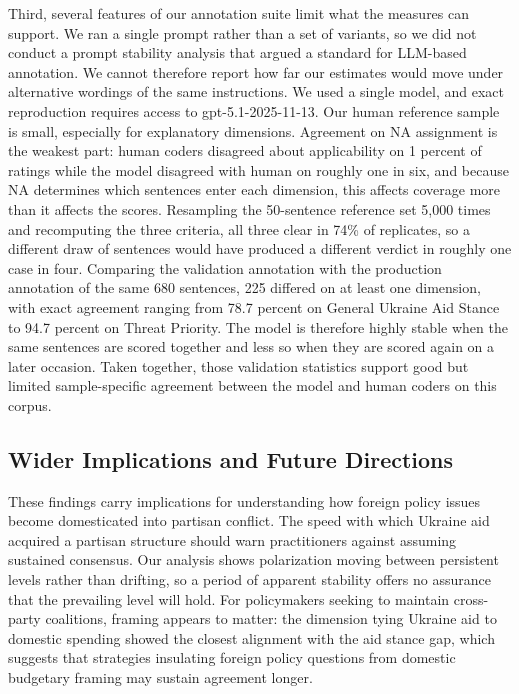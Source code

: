 Third, several features of our annotation suite limit what the measures can support. We ran a single prompt rather than a set of variants, so we did not conduct a prompt stability analysis that \citet{tornbergBestPracticesText2024} argued a standard for LLM-based annotation. We cannot therefore report how far our estimates would move under alternative wordings of the same instructions. We used a single model, and exact reproduction requires access to gpt-5.1-2025-11-13. Our human reference sample is small, especially for explanatory dimensions. Agreement on NA assignment is the weakest part: human coders disagreed about applicability on 1 percent of ratings while the model disagreed with human on roughly one in six, and because NA determines which sentences enter each dimension, this affects coverage more than it affects the scores. Resampling the 50-sentence reference set 5,000 times and recomputing the three criteria, all three clear in 74\% of replicates, so a different draw of sentences would have produced a different verdict in roughly one case in four. Comparing the validation annotation with the production annotation of the same 680 sentences, 225 differed on at least one dimension, with exact agreement ranging from 78.7 percent on General Ukraine Aid Stance to 94.7 percent on Threat Priority. The model is therefore highly stable when the same sentences are scored together and less so when they are scored again on a later occasion. Taken together, those validation statistics support good but limited sample-specific agreement between the model and human coders on this corpus.

\subsection{Wider Implications and Future Directions}

These findings carry implications for understanding how foreign policy issues become domesticated into partisan conflict. The speed with which Ukraine aid acquired a partisan structure should warn practitioners against assuming sustained consensus. Our analysis shows polarization moving between persistent levels rather than drifting, so a period of apparent stability offers no assurance that the prevailing level will hold. For policymakers seeking to maintain cross-party coalitions, framing appears to matter: the dimension tying Ukraine aid to domestic spending showed the closest alignment with the aid stance gap, which suggests that strategies insulating foreign policy questions from domestic budgetary framing may sustain agreement longer.

